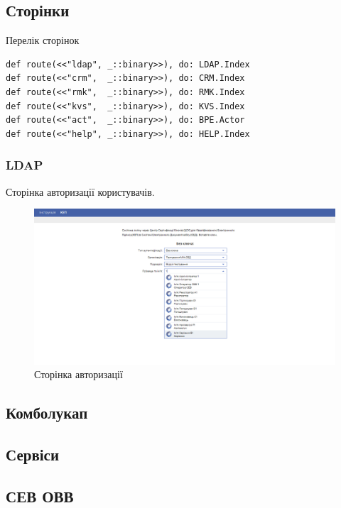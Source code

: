 \subsection{Сторінки}

Перелік сторінок

\begin{lstlisting}
def route(<<"ldap", _::binary>>), do: LDAP.Index
def route(<<"crm",  _::binary>>), do: CRM.Index
def route(<<"rmk",  _::binary>>), do: RMK.Index
def route(<<"kvs",  _::binary>>), do: KVS.Index
def route(<<"act",  _::binary>>), do: BPE.Actor
def route(<<"help", _::binary>>), do: HELP.Index
\end{lstlisting}

\subsubsection{LDAP}

Сторінка авторизації користувачів.

\begin{figure}[!htbp]
\centerline{\includegraphics[scale=0.25]{LDAP.PNG}}
\caption{Сторінка авторизації}
\end{figure}

\subsection{Комболукап}

\subsection{Сервіси}

\subsection{СЕВ ОВВ}

